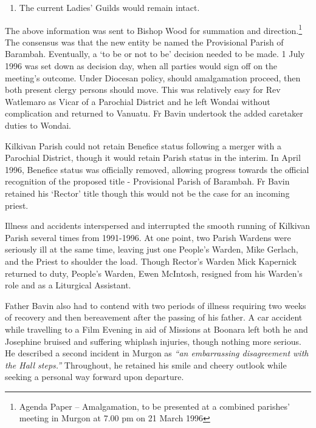 \begin{enumerate}

\def\labelenumi{\arabic{enumi}.}

\setcounter{enumi}{5}

\item

  The current Ladies' Guilds would remain intact.

\end{enumerate}



\smallskip


The above information was sent to Bishop Wood for summation and direction.\footnote{Agenda Paper -- Amalgamation, to be presented at a combined parishes' meeting in Murgon at 7.00 pm on 21 March 1996} The consensus was that the new entity be named the Provisional Parish of Barambah. Eventually, a `to be or not to be' decision needed to be made. 1 July 1996 was set down as decision day, when all parties would sign off on the meeting's outcome. Under Diocesan policy, should amalgamation proceed, then both present clergy persons should move. This was relatively easy for Rev Watlemaro as Vicar of a Parochial District and he left Wondai without complication and returned to Vanuatu. Fr Bavin undertook the added caretaker duties to Wondai.


Kilkivan Parish could not retain Benefice status following a merger with a Parochial District, though it would retain Parish status in the interim. In April 1996, Benefice status was officially removed, allowing progress towards the official recognition of the proposed title - Provisional Parish of Barambah. Fr Bavin retained his `Rector' title though this would not be the case for an incoming priest.



Illness and accidents interspersed and interrupted the smooth running of Kilkivan Parish several times from 1991-1996. At one point, two Parish Wardens were seriously ill at the same time, leaving just one People's Warden, Mike Gerlach, and the Priest to shoulder the load. Though Rector's Warden Mick Kapernick returned to duty, People's Warden, Ewen McIntosh, resigned from his Warden's role and as a Liturgical Assistant.



Father Bavin also had to contend with two periods of illness requiring two weeks of recovery and then bereavement after the passing of his father. A car accident while travelling to a Film Evening in aid of Missions at Boonara left both he and Josephine bruised and suffering whiplash injuries, though nothing more serious. He described a second incident in Murgon as \emph{``an embarrassing disagreement with the Hall steps.''} Throughout, he retained his smile and cheery outlook while seeking a personal way forward upon departure.



